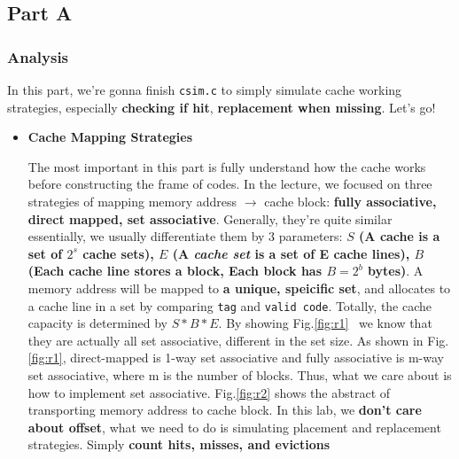 \documentclass{article}
\begin{document}
\subsection{Part A}

\subsubsection{Analysis}

In this part, we're gonna finish \lstinline|csim.c| to simply simulate cache working strategies, especially \textbf{checking if hit}, \textbf{replacement when missing}. Let's go!

\begin{itemize}
	\item \textbf{Cache Mapping Strategies}
	
	The most important in this part is fully understand how the cache works before constructing the frame of codes. In the lecture, we focused on three strategies of mapping memory address $\rightarrow$ cache block: \textbf{fully associative, direct mapped, set associative}. Generally, they're quite similar essentially, we usually differentiate them by 3 parameters: \textbf{$ S $ (A cache is a set of $ 2^s $ cache sets), $ E $ (A \textit{cache set} is a set of E cache lines), $ B $ (Each cache line stores a block, Each block has $ B=2^b $ bytes)}. A memory address will be mapped to \textbf{a unique, speicific set}, and allocates to a cache line in a set by comparing \lstinline|tag| and \lstinline|valid code|. Totally, the cache capacity is determined by $ S*B*E $. By showing Fig.\ref{fig:r1}~\cite{bryant2003computer} we know that they are actually all set associative, different in the set size. As shown in Fig.\ref{fig:r1}, direct-mapped is 1-way set associative and fully associative is m-way set associative, where m is the number of blocks. Thus, what we care about is how to implement set associative. Fig.\ref{fig:r2} shows the abstract of transporting memory address to cache block. In this lab, we \textbf{don't care about offset}, what we need to do is simulating placement and replacement strategies. Simply \textbf{count hits,	misses,	and	evictions}
	

\end{itemize}
\end{document}
